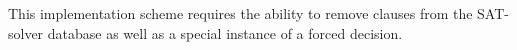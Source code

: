 \documentclass{llncs}
\begin{document}
This implementation scheme requires the ability to remove clauses from the SAT-solver database as well as a special instance of a forced decision.

\begin{comment}
\subsection{Via Controlling Decisions}

\noindent (C1) For a quantified formula $\psi$, maintain a set $L^\psi$ of literals $l_1, \ldots l_n, \bot^{\neg \psi} \in F$ such that $l_i \mapsto^I \psi$, $1 \leq i \leq n$, \\
(C2) When $\psi \not\in M$, mark literals, \\
(C3)
(C4) When $\psi^{(d)}$ is asserted to $M$, assert $\neg (\bot^{\neg \psi})^d$, \\
\end{comment}
\end{document}

